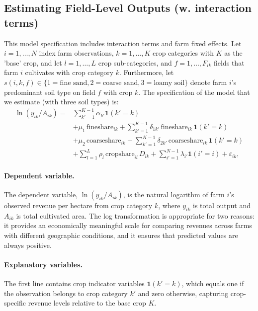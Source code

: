 \documentclass[12pt]{article}
\begin{document}
\subsection{Estimating Field-Level Outputs (w. interaction terms)}
This model specification includes interaction terms and farm fixed effects.
Let $i = 1, \ldots, N$ index farm observations, $k = 1, \ldots, K$ crop categories with $K$ as the 'base' crop, and let $l = 1, \ldots, L$ crop sub-categories, and $f = 1, \ldots, F_{ik}$ fields that farm $i$ cultivates with crop category $k$.
Furthermore, let $s(i,k,f) \in \{1 = \text{fine sand}, 2 = \text{coarse sand}, 3 = \text{loamy soil}\}$ denote farm $i$'s predominant soil type on field $f$ with crop $k$. 
The specification of the model that we estimate (with three soil types) is:
\begin{equation}
\begin{aligned}
    \ln(y_{ik}/A_{ik}) = & \sum_{k'=1}^{K-1} \alpha_{k'} \mathbf{1}(k'=k) \\
    &+ \mu_1\,\text{fineshare}_{ik} 
    + \sum_{k'=1}^{K-1} \delta_{1k'}\,\text{fineshare}_{ik}\,\mathbf{1}(k'=k) \\
    &+ \mu_2\,\text{coarseshare}_{ik} 
    + \sum_{k'=1}^{K-1} \delta_{2k'}\,\text{coarseshare}_{ik}\,\mathbf{1}(k'=k) \\
    &+ \sum_{l=1}^{L} \rho_l\,\text{cropshare}_{il}\,D_{lk} 
    + \sum_{i'=1}^{N-1} \lambda_{i'} \mathbf{1}(i' = i) + \varepsilon_{ik},
    \end{aligned}
\end{equation}
\paragraph{Dependent variable.} The dependent variable, $\ln(y_{ik}/A_{ik})$, is the natural logarithm of farm $i$'s observed revenue per hectare from crop category $k$, where $y_{ik}$ is total output and $A_{ik}$ is total cultivated area.
The log transformation is appropriate for two reasons: it provides an economically meaningful scale for comparing revenues across farms with different geographic conditions, and it ensures that predicted values are always positive.


\paragraph{Explanatory variables.}
The first line contains crop indicator variables $\mathbf{1}(k'=k)$,
which equals one if the observation belongs to crop category $k'$ and
zero otherwise, capturing crop-specific revenue levels relative to the
base crop $K$.
\end{document}
